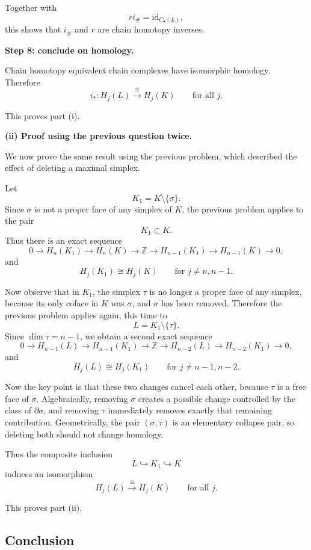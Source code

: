 \documentclass[12pt,a4paper]{article}
\theoremstyle{notespace}
\begin{document}
Together with
\[
r i_\# = \mathrm{id}_{C_\bullet(L)},
\]
this shows that \(i_\#\) and \(r\) are chain homotopy inverses.

\medskip

\textbf{Step 8: conclude on homology.}

Chain homotopy equivalent chain complexes have isomorphic homology. Therefore
\[
i_*:H_j(L)\xrightarrow{\cong} H_j(K)
\qquad\text{for all } j.
\]

This proves part (i).

\bigskip

\textbf{(ii) Proof using the previous question twice.}

We now prove the same result using the previous problem, which described the effect of deleting a maximal simplex.

Let
\[
K_1 = K\setminus\{\sigma\}.
\]
Since \(\sigma\) is not a proper face of any simplex of \(K\), the previous problem applies to the pair
\[
K_1 \subset K.
\]
Thus there is an exact sequence
\[
0 \to H_n(K_1)\to H_n(K)\to \mathbb Z
\to H_{n-1}(K_1)\to H_{n-1}(K)\to 0,
\]
and
\[
H_j(K_1)\cong H_j(K)
\qquad\text{for } j\neq n,n-1.
\]

Now observe that in \(K_1\), the simplex \(\tau\) is no longer a proper face of any simplex, because its only coface in \(K\) was \(\sigma\), and \(\sigma\) has been removed. Therefore the previous problem applies again, this time to
\[
L = K_1\setminus\{\tau\}.
\]
Since \(\dim \tau=n-1\), we obtain a second exact sequence
\[
0 \to H_{n-1}(L)\to H_{n-1}(K_1)\to \mathbb Z
\to H_{n-2}(L)\to H_{n-2}(K_1)\to 0,
\]
and
\[
H_j(L)\cong H_j(K_1)
\qquad\text{for } j\neq n-1,n-2.
\]

Now the key point is that these two changes cancel each other, because \(\tau\) is a free face of \(\sigma\). Algebraically, removing \(\sigma\) creates a possible change controlled by the class of \(\partial \sigma\), and removing \(\tau\) immediately removes exactly that remaining contribution. Geometrically, the pair \((\sigma,\tau)\) is an elementary collapse pair, so deleting both should not change homology.

Thus the composite inclusion
\[
L \hookrightarrow K_1 \hookrightarrow K
\]
induces an isomorphism
\[
H_j(L)\xrightarrow{\cong} H_j(K)
\qquad\text{for all } j.
\]

This proves part (ii).

\subsection{Conclusion}
\end{document}
